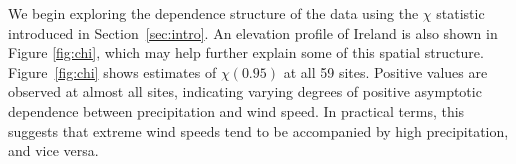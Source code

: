 \documentclass[12pt]{article}
\begin{document}

We begin exploring the dependence structure of the data using the $\chi$ statistic introduced in Section~\ref{sec:intro}. 
An elevation profile of Ireland is also shown in Figure \ref{fig:chi}, which may help further explain some of this spatial structure.
Figure~\ref{fig:chi} shows estimates of $\chi(0.95)$ at all 59 sites.
Positive values are observed at almost all sites, indicating varying degrees of positive asymptotic dependence between precipitation and wind speed. 
In practical terms, this suggests that extreme wind speeds tend to be accompanied by high precipitation, and vice versa. 
\end{document}
